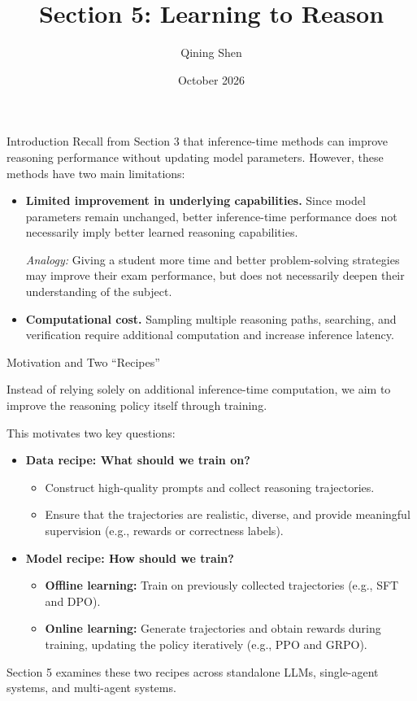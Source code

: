 \documentclass[aspectratio=169]{beamer}
\title{Section 5: Learning to Reason}
\author{Qining Shen}
\date{October 2026}
\begin{document}
\maketitle

\begin{frame}{Introduction}
Recall from Section 3 that inference-time methods can improve reasoning performance without updating model parameters.
However, these methods have two main limitations:
\begin{itemize}
    \item \textbf{Limited improvement in underlying capabilities.}
    Since model parameters remain unchanged, better inference-time performance does not necessarily imply better learned reasoning capabilities.

    \textit{Analogy:} Giving a student more time and better problem-solving strategies may improve their exam performance, but does not necessarily deepen their understanding of the subject.

    \item \textbf{Computational cost.}
    Sampling multiple reasoning paths, searching, and verification require additional computation and increase inference latency.
\end{itemize}
\end{frame}
\begin{frame}{Motivation and Two ``Recipes''}

Instead of relying solely on additional inference-time computation, we aim to improve the reasoning policy itself through training.

This motivates two key questions:

\begin{itemize}
    \item \textbf{Data recipe: What should we train on?}
    \begin{itemize}
        \item Construct high-quality prompts and collect reasoning trajectories.
        \item Ensure that the trajectories are realistic, diverse, and provide meaningful supervision (e.g., rewards or correctness labels).
    \end{itemize}

    \item \textbf{Model recipe: How should we train?}
    \begin{itemize}
        \item \textbf{Offline learning:} Train on previously collected trajectories (e.g., SFT and DPO).
        \item \textbf{Online learning:} Generate trajectories and obtain rewards during training, updating the policy iteratively (e.g., PPO and GRPO).
    \end{itemize}
\end{itemize}

Section 5 examines these two recipes across standalone LLMs, single-agent systems, and multi-agent systems.


\end{frame}
\end{document}
